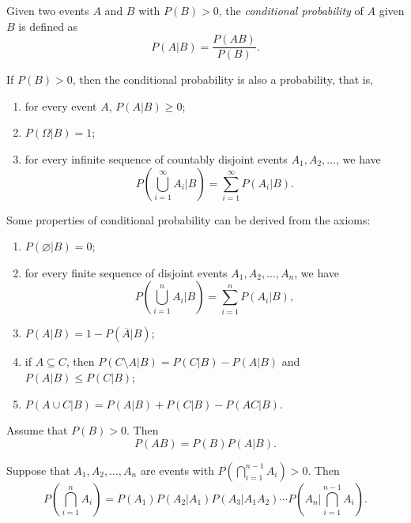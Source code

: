 \begin{definition}
  Given two events \(A\) and \(B\) with \(P(B) > 0\), the \emph{conditional probability} of \(A\) given \(B\) is defined as
  \[
    P(A \vert B) = \frac{P(A B)}{P(B)}.
  \]
\end{definition}

\begin{theorem}
  If \(P(B) > 0\), then the conditional probability is also a probability, that is,
  \begin{enumerate}
    \item for every event \(A\), \(P(A \vert B) \geq 0\);
    \item \(P(\Omega \vert B) = 1\);
    \item for every infinite sequence of countably disjoint events \(A_1, A_2, \dots\), we have
    \[
      P\left(\bigcup_{i=1}^\infty A_i \vert B\right) = \sum_{i=1}^\infty P(A_i \vert B).
    \]
  \end{enumerate}
\end{theorem}

\begin{proposition}
  Some properties of conditional probability can be derived from the axioms:
  \begin{enumerate}
    \item \(P(\varnothing \vert B) = 0\);
    \item for every finite sequence of disjoint events \(A_1, A_2, \dots, A_n\), we have
    \[
      P\left(\bigcup_{i=1}^n A_i \vert B\right) = \sum_{i=1}^n P(A_i \vert B),
    \]
    \item \(P(A \vert B) = 1 - P(\overline{A} \vert B)\);
    \item if \(A \subseteq C\), then \(P(C \setminus A \vert B) = P(C \vert B) - P(A \vert B)\) and \(P(A \vert B) \leq P(C \vert B)\);
    \item \(P(A \cup C \vert B) = P(A \vert B) + P(C \vert B) - P(A C \vert B)\).
  \end{enumerate}
\end{proposition}

\begin{theorem}
  Assume that \(P(B) > 0\). Then
  \[
    P(A B) = P(B) P(A \vert B).
  \]
\end{theorem}

\begin{theorem}
  Suppose that \(A_1, A_2, \dots, A_n\) are events with \(P\left(\bigcap_{i=1}^{n-1} A_i\right) > 0\). Then
  \[
    P\left(\bigcap_{i=1}^n A_i\right) = P(A_1) P(A_2 \vert A_1) P(A_3 \vert A_1 A_2) \cdots P\left(A_n \vert \bigcap_{i=1}^{n-1} A_i\right).
  \]
\end{theorem}

